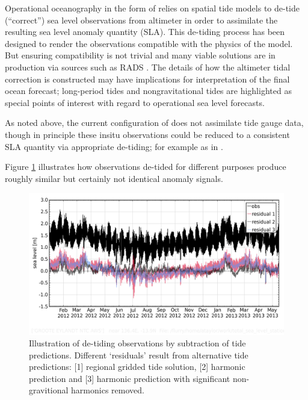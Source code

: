 Operational oceanography in the form of \BL{} relies on spatial tide models to de-tide (``correct'') sea level observations from altimeter in order to assimilate the resulting sea level anomaly quantity (SLA).   This de-tiding process has been designed to render the observations compatible with the physics of the model.  But ensuring compatibility is not trivial and  many viable solutions are in production via sources such as RADS \citep[table 3.2]{Scharroo:2011vd}.  The details of how the altimeter tidal correction is constructed may have implications for interpretation of the final ocean forecast; long-period tides \citep{Egbert:2003jd} and nongravitational tides \citep{Arbic:2005gv} are highlighted as special points of interest with regard to operational sea level forecasts.

As noted above, the current configuration of \BL{} does not assimilate tide gauge data, though in principle these insitu observations could be reduced to a consistent SLA quantity via appropriate de-tiding; for example as in \cite{Matsumoto:2000tg}.

Figure \ref{fig:residualExample} illustrates how observations de-tided for different purposes produce roughly similar but certainly not identical anomaly signals. 

\begin{figure}[h]
\begin{center}
    \includegraphics[width=\figwidthFull]{figures/plots/diag_plot_014406_detide_compare_20120101.png}
    \caption{Illustration of de-tiding observations by subtraction of tide predictions.  Different `residuals' result from alternative tide predictions: [1] regional gridded tide solution, [2] harmonic prediction and [3] harmonic prediction with significant non-gravitional harmonics removed. }
    \end{center}
    \label{fig:residualExample}
\end{figure}


